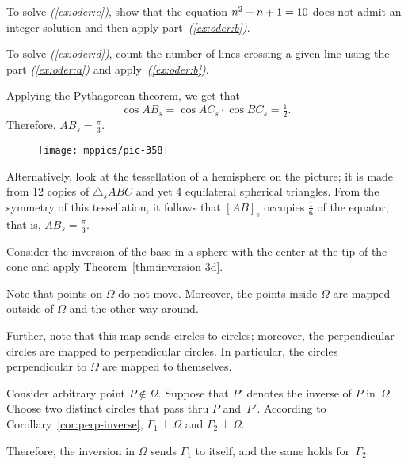 {



To solve \textit{(\ref{ex:oder:c})}, show that the equation
$n^2+n+1\z=10$ 
does not admit an integer solution and then apply part~\textit{(\ref{ex:oder:b})}.


To solve \textit{(\ref{ex:oder:d})}, count the number of lines crossing a given line using the 
part \textit{(\ref{ex:oder:a})} and apply~\textit{(\ref{ex:oder:b})}.

\setcounter{eqtn}{0}


Applying the Pythagorean theorem, we get that
$$
\cos AB_s=\cos AC_s\cdot\cos BC_s=\tfrac12.
$$
Therefore, $AB_s=\tfrac\pi3$.

\begin{wrapfigure}[12]{r}{43mm}
\vskip-0mm
\centering
\texttt{[image: mppics/pic-358]}
\end{wrapfigure}

Alternatively, 
look at the tessellation of a hemisphere on the picture; 
it is made from 12 copies of $\triangle_s A B C$ and yet 4 equilateral spherical triangles.
From the symmetry of this tessellation, it follows that $[AB]_s$ occupies $\tfrac16$ of the equator; that is, $AB_s=\tfrac\pi3$.

Consider the inversion of the base in a sphere with the center at the tip of the cone and apply Theorem~\ref{thm:inversion-3d}.

Note that points on $\Omega$ do not move.
Moreover, the points inside $\Omega$ 
are mapped outside of $\Omega$ and the other way around.

}

Further, note that this map sends circles to circles;
moreover, the perpendicular circles are mapped to perpendicular circles.
In particular, the circles perpendicular to $\Omega$ are mapped to themselves.

Consider arbitrary point $P\notin\Omega$.
Suppose that $P'$ denotes the inverse of $P$ in~$\Omega$.
Choose two distinct circles that pass thru $P$ and~$P'$.
According to Corollary~\ref{cor:perp-inverse}, 
$\Gamma_1\perp \Omega$ and $\Gamma_2\perp \Omega$.

Therefore, the inversion in $\Omega$ sends $\Gamma_1$ to itself, and the same holds for~$\Gamma_2$. 

